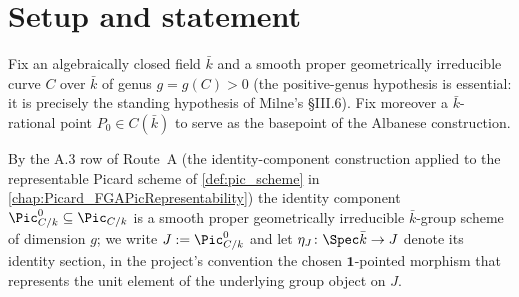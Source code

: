 %
%

\section{Setup and statement}
\label{sec:albaneseup_setup}

Fix an algebraically closed field \(\bar k\) and a smooth proper geometrically
irreducible curve \(C\) over \(\bar k\) of genus \(g = g(C) > 0\) (the positive-genus
hypothesis is essential: it is precisely the standing hypothesis of Milne's
\S III.6). Fix moreover a \(\bar k\)-rational point \(P_0 \in C(\bar k)\) to serve
as the basepoint of the Albanese construction.

By the A.3 row of Route~A (the identity-component construction applied to the
representable Picard scheme of
\cref{def:pic_scheme} in \cref{chap:Picard_FGAPicRepresentability}) the
identity component \(\Pic^0_{C/k} \subseteq \Pic_{C/k}\) is a smooth proper
geometrically irreducible \(\bar k\)-group scheme of dimension \(g\); we write
\(J := \Pic^0_{C/k}\) and let \(\eta_J \colon \Spec \bar k \to J\) denote its
identity section, in the project's convention the chosen \(\mathbf 1\)-pointed
morphism that represents the unit element of the underlying group object on
\(J\).

